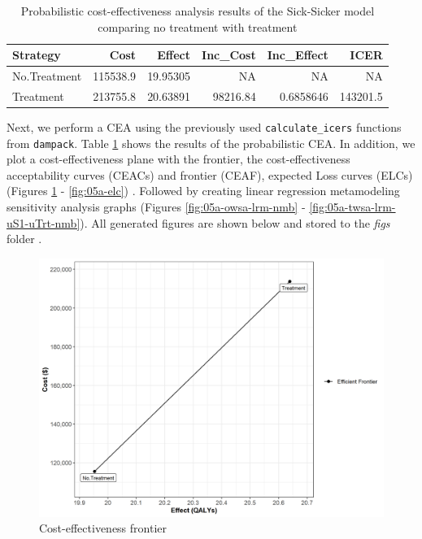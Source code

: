\documentclass[]{book}
\begin{document}
\begin{table}[t]

\caption{\label{tab:df-cea-prob}Probabilistic cost-effectiveness analysis results of the Sick-Sicker model comparing no treatment with treatment}
\centering
\begin{tabular}{l|r|r|r|r|r}
\hline
Strategy & Cost & Effect & Inc\_Cost & Inc\_Effect & ICER\\
\hline
No.Treatment & 115538.9 & 19.95305 & NA & NA & NA\\
\hline
Treatment & 213755.8 & 20.63891 & 98216.84 & 0.6858646 & 143201.5\\
\hline
\end{tabular}
\end{table}

Next, we perform a CEA using the previously used \texttt{calculate\_icers} functions from \texttt{dampack}. Table \ref{tab:df-cea-prob} shows the results of the probabilistic CEA. In addition, we plot a cost-effectiveness plane with the frontier, the cost-effectiveness acceptability curves (CEACs) and frontier (CEAF), expected Loss curves (ELCs) (Figures \ref{fig:05a-cea-frontier-psa} - \ref{fig:05a-elc}) \citep{Alarid-Escudero2019}. Followed by creating linear regression metamodeling sensitivity analysis graphs (Figures \ref{fig:05a-owsa-lrm-nmb} - \ref{fig:05a-twsa-lrm-uS1-uTrt-nmb})\citep{Jalal2013}. All generated figures are shown below and stored to the \emph{figs} folder .

\begin{figure}

{\centering \includegraphics[width=1\linewidth]{../figs/05a_cea_frontier_psa} 

}

\caption{Cost-effectiveness frontier}\label{fig:05a-cea-frontier-psa}
\end{figure}
\end{document}
